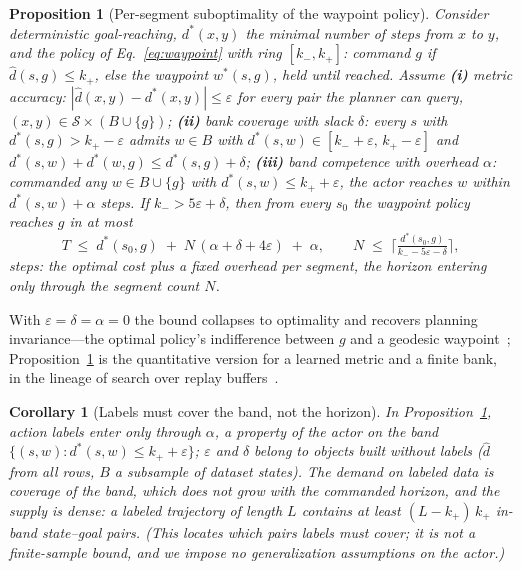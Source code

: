 \documentclass{article}
\theoremstyle{plain}
\newtheorem{proposition}{Proposition}
\newtheorem{corollary}{Corollary}
\theoremstyle{definition}
\begin{document}
\begin{proposition}[Per-segment suboptimality of the waypoint policy]
\label{prop:waypoint}
Consider deterministic goal-reaching, $d^\ast(x,y)$ the minimal number of steps from $x$ to $y$, and the policy of Eq.~\ref{eq:waypoint} with ring $[k_-,k_+]$: command $g$ if $\hat d(s,g)\le k_+$, else the waypoint $w^\ast(s,g)$, held until reached. Assume
\textbf{(i)} \emph{metric accuracy:} $|\hat d(x,y)-d^\ast(x,y)|\le\varepsilon$ for every pair the planner can query, $(x,y)\in\mathcal S\times(B\cup\{g\})$;
\textbf{(ii)} \emph{bank coverage with slack $\delta$:} every $s$ with $d^\ast(s,g)>k_+-\varepsilon$ admits $w\in B$ with $d^\ast(s,w)\in[k_-+\varepsilon,\,k_+-\varepsilon]$ and $d^\ast(s,w)+d^\ast(w,g)\le d^\ast(s,g)+\delta$;
\textbf{(iii)} \emph{band competence with overhead $\alpha$:} commanded any $w\in B\cup\{g\}$ with $d^\ast(s,w)\le k_++\varepsilon$, the actor reaches $w$ within $d^\ast(s,w)+\alpha$ steps.
If $k_->5\varepsilon+\delta$, then from every $s_0$ the waypoint policy reaches $g$ in at most
\begin{equation}
T\;\le\;d^\ast(s_0,g)\;+\;N\,(\alpha+\delta+4\varepsilon)\;+\;\alpha,
\qquad
N\;\le\;\Big\lceil\tfrac{d^\ast(s_0,g)}{k_--5\varepsilon-\delta}\Big\rceil ,
\label{eq:wpbound}
\end{equation}
steps: the optimal cost plus a fixed overhead per segment, the horizon entering only through the segment count $N$.
\end{proposition}

With $\varepsilon=\delta=\alpha=0$ the bound collapses to optimality and recovers planning invariance---the optimal policy's indifference between $g$ and a geodesic waypoint~\citep{horizongen}; Proposition~\ref{prop:waypoint} is the quantitative version for a learned metric and a finite bank, in the lineage of search over replay buffers~\citep{sorb}.

\begin{corollary}[Labels must cover the band, not the horizon]
\label{cor:band}
In Proposition~\ref{prop:waypoint}, action labels enter only through $\alpha$, a property of the actor on the band $\{(s,w):d^\ast(s,w)\le k_++\varepsilon\}$; $\varepsilon$ and $\delta$ belong to objects built without labels ($\hat d$ from all rows, $B$ a subsample of dataset states). The demand on labeled data is coverage of the band, which does not grow with the commanded horizon, and the supply is dense: a labeled trajectory of length $L$ contains at least $(L-k_+)\,k_+$ in-band state--goal pairs. (This locates which pairs labels must cover; it is not a finite-sample bound, and we impose no generalization assumptions on the actor.)
\end{corollary}
\end{document}
